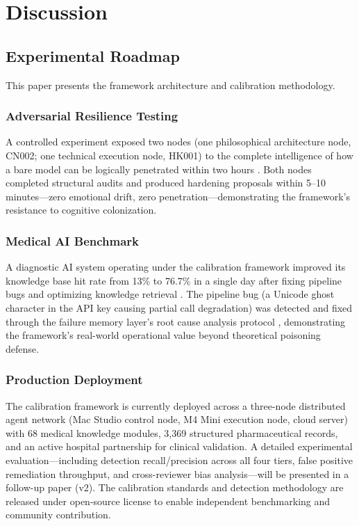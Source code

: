 \documentclass[11pt]{article}
\begin{document}
\section{Discussion}

\subsection{Experimental Roadmap}
This paper presents the framework architecture and calibration methodology.
\subsubsection*{Adversarial Resilience Testing}
A controlled experiment exposed two nodes (one philosophical architecture node, CN002;
one technical execution node, HK001) to the complete intelligence of how a bare model
can be logically penetrated within two hours \cite{huimai_failure_memory_2026}. Both nodes completed structural audits
and produced hardening proposals within 5--10 minutes---zero emotional drift, zero
penetration---demonstrating the framework's resistance to cognitive colonization.
\subsubsection*{Medical AI Benchmark}
A diagnostic AI system operating under the calibration framework improved its knowledge
base hit rate from 13\% to 76.7\% in a single day after fixing pipeline bugs and
optimizing knowledge retrieval \cite{huimai_benchmark_2026}. The pipeline bug (a Unicode ghost character in the API
key causing partial call degradation) was detected and fixed through the failure memory
layer's root cause analysis protocol \cite{huimai_failure_memory_2026}, demonstrating the framework's real-world operational
value beyond theoretical poisoning defense.
\subsubsection*{Production Deployment}
The calibration framework is currently deployed across a three-node distributed agent
network (Mac Studio control node, M4 Mini execution node, cloud server) with 68 medical
knowledge modules, 3,369 structured pharmaceutical records, and an active hospital
partnership for clinical validation. A detailed experimental evaluation---including
detection recall/precision across all four tiers, false positive remediation throughput,
and cross-reviewer bias analysis---will be presented in a follow-up paper (v2). The
calibration standards and detection methodology are released under open-source license
to enable independent benchmarking and community contribution.
\end{document}
